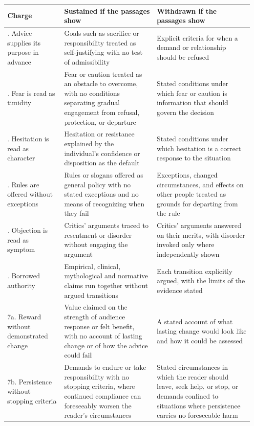 \documentclass[12pt]{article}
\begin{document}
{\small
\renewcommand{\arraystretch}{1.2}
\begin{longtable}{>{\raggedright\arraybackslash}p{} >{\raggedright\arraybackslash}p{} >{\raggedright\arraybackslash}p{}}
\hline
\textbf{Charge} & \textbf{Sustained if the passages show} & \textbf{Withdrawn if the passages show} \\
\hline
1. Advice supplies its purpose in advance & Goals such as sacrifice or responsibility treated as self-justifying with no test of admissibility & Explicit criteria for when a demand or relationship should be refused \\
2. Fear is read as timidity & Fear or caution treated as an obstacle to overcome, with no conditions separating gradual engagement from refusal, protection, or departure & Stated conditions under which fear or caution is information that should govern the decision \\
3. Hesitation is read as character & Hesitation or resistance explained by the individual's confidence or disposition as the default & Stated conditions under which hesitation is a correct response to the situation \\
4. Rules are offered without exceptions & Rules or slogans offered as general policy with no stated exceptions and no means of recognizing when they fail & Exceptions, changed circumstances, and effects on other people treated as grounds for departing from the rule \\
5. Objection is read as symptom & Critics' arguments traced to resentment or disorder without engaging the argument & Critics' arguments answered on their merits, with disorder invoked only where independently shown \\
6. Borrowed authority & Empirical, clinical, mythological and normative claims run together without argued transitions & Each transition explicitly argued, with the limits of the evidence stated \\
7a. Reward without demonstrated change & Value claimed on the strength of audience response or felt benefit, with no account of lasting change or of how the advice could fail & A stated account of what lasting change would look like and how it could be assessed \\
7b. Persistence without stopping criteria & Demands to endure or take responsibility with no stopping criteria, where continued compliance can foreseeably worsen the reader's circumstances & Stated circumstances in which the reader should leave, seek help, or stop, or demands confined to situations where persistence carries no foreseeable harm \\

\end{longtable}}
\end{document}
